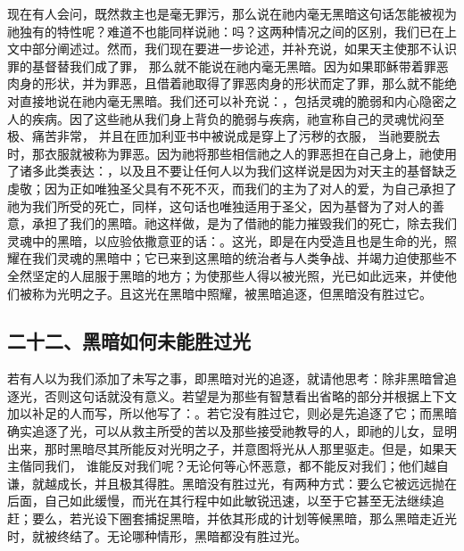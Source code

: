 现在有人会问，既然救主也是毫无罪污，那么说在祂内毫无黑暗这句话怎能被视为祂独有的特性呢？难道不也能同样说祂：吗？这两种情况之间的区别，我们已在上文中部分阐述过。然而，我们现在要进一步论述，并补充说，如果天主使那不认识罪的基督替我们成了罪， 那么就不能说在祂内毫无黑暗。因为如果耶稣带着罪恶肉身的形状，并为罪恶，且借着祂取得了罪恶肉身的形状而定了罪，那么就不能绝对直接地说在祂内毫无黑暗。我们还可以补充说：，包括灵魂的脆弱和内心隐密之人的疾病。因了这些祂从我们身上背负的脆弱与疾病，祂宣称自己的灵魂忧闷至极、痛苦非常， 并且在匝加利亚书中被说成是穿上了污秽的衣服， 当祂要脱去时，那衣服就被称为罪恶。因为祂将那些相信祂之人的罪恶担在自己身上，祂使用了诸多此类表达：，以及且不要让任何人以为我们这样说是因为对天主的基督缺乏虔敬；因为正如唯独圣父具有不死不灭，而我们的主为了对人的爱，为自己承担了祂为我们所受的死亡，同样，这句话也唯独适用于圣父，因为基督为了对人的善意，承担了我们的黑暗。祂这样做，是为了借祂的能力摧毁我们的死亡，除去我们灵魂中的黑暗，以应验依撒意亚的话：。这光，即是在内受造且也是生命的光，照耀在我们灵魂的黑暗中；它已来到这黑暗的统治者与人类争战、并竭力迫使那些不全然坚定的人屈服于黑暗的地方；为使那些人得以被光照，光已如此远来，并使他们被称为光明之子。且这光在黑暗中照耀，被黑暗追逐，但黑暗没有胜过它。\par


\subsection{二十二、黑暗如何未能胜过光}

若有人以为我们添加了未写之事，即黑暗对光的追逐，就请他思考：除非黑暗曾追逐光，否则这句话就没有意义。若望是为那些有智慧看出省略的部分并根据上下文加以补足的人而写，所以他写了：。若它没有胜过它，则必是先追逐了它；而黑暗确实追逐了光，可以从救主所受的苦以及那些接受祂教导的人，即祂的儿女，显明出来，那时黑暗尽其所能反对光明之子，并意图将光从人那里驱走。但是，如果天主偕同我们， 谁能反对我们呢？无论何等心怀恶意，都不能反对我们；他们越自谦，就越成长，并且极其得胜。黑暗没有胜过光，有两种方式：要么它被远远抛在后面，自己如此缓慢，而光在其行程中如此敏锐迅速，以至于它甚至无法继续追赶；要么，若光设下圈套捕捉黑暗，并依其形成的计划等候黑暗，那么黑暗走近光时，就被终结了。无论哪种情形，黑暗都没有胜过光。\par

